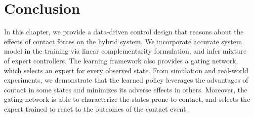 \section{Conclusion}
\label{sec:moe_conclusion}

In this chapter, we provide a data-driven control design that reasons about the
effects of contact forces on the hybrid system.
%
We incorporate accurate system model in the training via linear complementarity
formulation, and infer mixture of expert controllers.
%
The learning framework also provides a gating network, which selects an expert
for every observed state.
%
From simulation and real-world experiments, we demonstrate that the learned
policy leverages the advantages of contact in some states and minimizes its
adverse effects in others.
%
Moreover, the gating network is able to characterize the states prone to
contact, and selects the expert trained to react to the outcomes of the contact
event. 